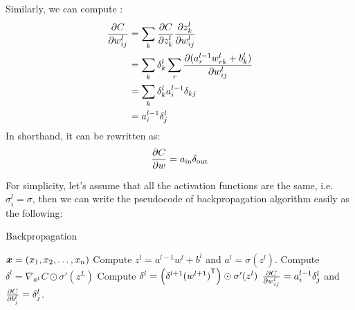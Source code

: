 Similarly, we can compute :
\begin{align*}
    \frac{\partial {C}}{\partial {w^l_{ij}}} &= \sum_k \frac{\partial {C}}{\partial {z^l_k}} \frac{\partial {z^l_k}}{\partial {w^l_{ij}}}\\
                        &= \sum_k \delta^l_k \sum_r \frac{\partial {(a^{l-1}_r w^l_{rk} + b^l_k)}}{\partial {w^l_{ij}}}\\
                        &= \sum_k \delta^l_k a^{l-1}_i \delta_{kj}\\
                        &= a^{l-1}_i \delta^l_j
\end{align*}
In shorthand, it can be rewritten as:
\begin{equation}
    \frac{\partial {C}}{\partial {w}} = a_{\text{in}}\delta_{\text{out}}
\end{equation}

For simplicity, let's assume that all the activation functions are the same, i.e. $\sigma^l_i = \sigma$, then 
we can write the pseudocode of backpropagation algorithm easily as the following:

\begin{algorithm}
    \caption{Backpropagation}\label{backpropagation}
    \begin{algorithmic}[1]
        \Require $\boldsymbol{x} = (x_1, x_2, \ldots, x_n)$
            \State Compute $z^l = a^{l-1} w^l + b^l$ and $a^l = \sigma(z^l)$.
        \EndFor
        \State Compute $\delta^l = \nabla_{a^L}C \odot \sigma'(z^L)$
            \State Compute $\delta^l = \left(\delta^{l+1} {(w^{l+1})}^\mathsf{T}\right) \odot \sigma'(z^l)$
        \EndFor
        \Ensure $\frac{\partial {C}}{\partial {w^l_{ij}}} = a^{l-1}_i \delta^l_j$ and $\frac{\partial {C}}{\partial {b^l_j}} = \delta^l_j$.
    \end{algorithmic}
\end{algorithm}

